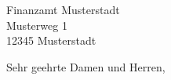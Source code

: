 \documentclass{scrlttr2}
\begin{document}
\begin{letter}{Finanzamt Musterstadt \\ Musterweg 1 \\ 12345 Musterstadt}
\opening{Sehr geehrte Damen und Herren,}

\end{letter}
\end{document}
